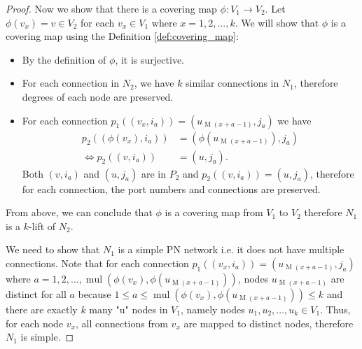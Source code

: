 \begin{proof}
    Now we show that there is a covering map $\phi: V_1 \rightarrow V_2$.
    Let $\phi(v_x) = v \in V_2$ for each $v_x \in V_1$ where $x=1, 2, ..., k$.
    We will show that $\phi$ is a covering map using the Definition \ref{def:covering_map}:
    \begin{itemize}
        \item By the definition of $\phi$, it is surjective.
        \item For each connection in $N_2$, we have $k$ similar connections in $N_1$, therefore degrees of each node are preserved.
        \item For each connection $p_1((v_{x}, i_a)) = (u_{\operatorname{M}(x+a-1)}, j_a)$ we have
        \begin{align*}
           p_2((\phi(v_{x}), i_a)) &= (\phi(u_{\operatorname{M}(x+a-1)}), j_a)\\
           \Leftrightarrow p_2((v, i_a)) &= (u, j_a).
        \end{align*}
        Both $(v, i_a)$ and $(u, j_a)$ are in $P_2$ and $p_2((v, i_a)) = (u, j_a)$, therefore for each connection, the port numbers and connections are preserved.
    \end{itemize}
    From above, we can conclude that $\phi$ is a covering map from $V_1$ to $V_2$
    therefore $N_1$ is a $k$-lift of $N_2$.

    We need to show that $N_1$ is a simple PN network i.e. it does not have multiple connections.
    Note that for each connection $p_1((v_{x}, i_a)) = (u_{\operatorname{M}(x+a-1)}, j_a)$ where $a=1, 2, ..., \operatorname{mul}(\phi(v_{x}),\phi(u_{\operatorname{M}(x+a-1)}))$, nodes $u_{\operatorname{M}(x+a-1)}$ are distinct for all $a$ because $1 \leq a \leq \operatorname{mul}(\phi(v_{x}),\phi(u_{\operatorname{M}(x+a-1)})) \leq k$ and
    there are exactly $k$ many "u" nodes in $V_1$, namely nodes $u_1, u_2, ..., u_k \in V_1$.
    Thus, for each node $v_x$, all connections from $v_x$ are mapped to distinct nodes, therefore $N_1$ is simple.


\end{proof}
